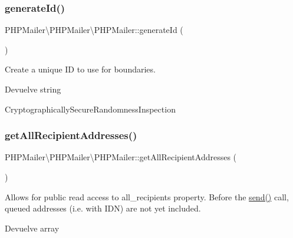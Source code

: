 \subsubsection{\texorpdfstring{generate\+Id()}{generateId()}}
{\footnotesize\ttfamily P\+H\+P\+Mailer\textbackslash{}\+P\+H\+P\+Mailer\textbackslash{}\+P\+H\+P\+Mailer\+::generate\+Id (\begin{DoxyParamCaption}{ }\end{DoxyParamCaption})\hspace{0.3cm}{\ttfamily [protected]}}

Create a unique ID to use for boundaries.

\begin{DoxyReturn}{Devuelve}
string 
\end{DoxyReturn}
Cryptographically\+Secure\+Randomness\+Inspection \mbox{\label{classPHPMailer_1_1PHPMailer_1_1PHPMailer_a54765cd58729192c7db9ffa6dbaf5bde}} 
\subsubsection{\texorpdfstring{get\+All\+Recipient\+Addresses()}{getAllRecipientAddresses()}}
{\footnotesize\ttfamily P\+H\+P\+Mailer\textbackslash{}\+P\+H\+P\+Mailer\textbackslash{}\+P\+H\+P\+Mailer\+::get\+All\+Recipient\+Addresses (\begin{DoxyParamCaption}{ }\end{DoxyParamCaption})}

Allows for public read access to \textquotesingle{}all\+\_\+recipients\textquotesingle{} property. Before the \hyperlink{classPHPMailer_1_1PHPMailer_1_1PHPMailer_a80ad2451096e940360c7439c22303edf}{send()} call, queued addresses (i.\+e. with I\+DN) are not yet included.

\begin{DoxyReturn}{Devuelve}
array 
\end{DoxyReturn}
\mbox{\label{classPHPMailer_1_1PHPMailer_1_1PHPMailer_add1bb7a6ecd0d19bdaab537867dbb024}} 
